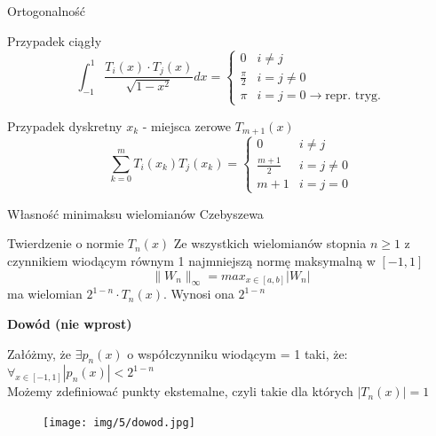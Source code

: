 \begin{frame}{Ortogonalność}
	\begin{block}{Przypadek ciągły}
		$$\int_{-1}^{1}\frac{T_i(x) \cdot T_j(x)}{\sqrt{1-x^2}}dx = \left\{\begin{array}{lc}
			0 & i \not= j \\
            \frac{\pi}{2} & i = j \not= 0 \\
            \pi & i = j = 0 \rightarrow \text{repr. tryg.}
		\end{array}\right.$$
	\end{block}
    
    \begin{block}{Przypadek dyskretny $x_k$ - miejsca zerowe $T_{m+1}(x)$}
    $$\sum_{k=0}^{m}T_i(x_k)T_j(x_k) = \left\{\begin{array}{rc}
    	0 & i \not= j \\
        \frac{m+1}{2} & i=j \not= 0 \\
        m+1 & i=j=0
    \end{array}\right.$$
    \end{block}
\end{frame}
\begin{frame}{Własność minimaksu wielomianów Czebyszewa}
	\begin{block}{Twierdzenie o normie $T_n(x)$}
		Ze wszystkich wielomianów stopnia $n\geqslant1$ z czynnikiem wiodącym równym 1 najmniejszą normę maksymalną w $[-1,1]$
        $$\lVert W_n \rVert _{\infty} = max_{x \in [a,b]}|W_n|$$
        ma wielomian $2^{1-n} \cdot T_n(x)$. Wynosi ona $2^{1-n}$
	\end{block}
\end{frame}
\begin{frame}
	\textbf{Dowód (nie wprost) }\newline
	
		Załóżmy, że $\exists p_n(x)$ o współczynniku wiodącym = 1 taki, że:
      \\$\forall_{x \in [-1,1]}|p_n(x)| < 2^{1-n}$\\
      Możemy zdefiniować punkty ekstemalne, czyli takie dla których $|T_n(x)|=1$
    \begin{figure}
		\texttt{[image: img/5/dowod.jpg]}
	\end{figure}
\end{frame}
